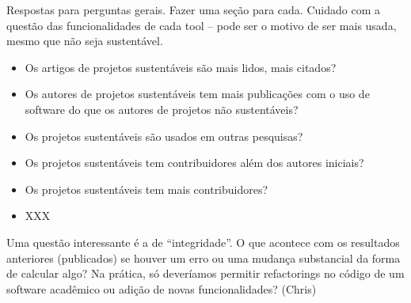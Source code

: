 \label{discussao}


Respostas para perguntas gerais. Fazer uma seção para cada.
Cuidado com a questão das funcionalidades de cada tool -- pode ser o motivo de ser mais usada,
mesmo que não seja sustentável.

\begin{itemize}
  \item Os artigos de projetos sustentáveis são mais lidos, mais citados?
  \item Os autores de projetos sustentáveis tem mais publicações com o uso de software do que os autores de projetos não sustentáveis?
  \item Os projetos sustentáveis são usados em outras pesquisas?
  \item Os projetos sustentáveis tem contribuidores além dos autores iniciais?
  \item Os projetos sustentáveis tem mais contribuidores?
  \item XXX
\end{itemize}

Uma questão interessante é a de ``integridade''. 
O que acontece com os resultados anteriores (publicados)
se houver um erro ou uma mudança substancial da forma de calcular algo?
Na prática, só deveríamos permitir refactorings no código de um software acadêmico ou adição de novas funcionalidades?
(Chris)

